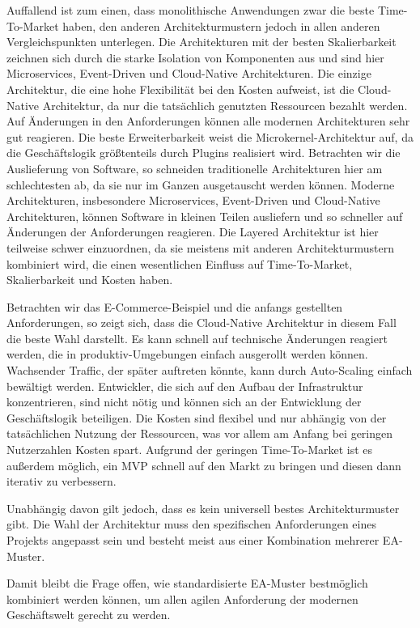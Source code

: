 \documentclass[acmtog]{acmart}
\begin{document}
Auffallend ist zum einen, dass monolithische Anwendungen zwar die beste Time-To-Market haben, den anderen Architekturmustern jedoch in allen anderen Vergleichspunkten unterlegen.
Die Architekturen mit der besten Skalierbarkeit zeichnen sich durch die starke Isolation von Komponenten aus und sind hier Microservices, Event-Driven und Cloud-Native Architekturen.
Die einzige Architektur, die eine hohe Flexibilität bei den Kosten aufweist, ist die Cloud-Native Architektur, da nur die tatsächlich genutzten Ressourcen bezahlt werden.
Auf Änderungen in den Anforderungen können alle modernen Architekturen sehr gut reagieren.
Die beste Erweiterbarkeit weist die Microkernel-Architektur auf, da die Geschäftslogik größtenteils durch Plugins realisiert wird.
Betrachten wir die Auslieferung von Software, so schneiden traditionelle Architekturen hier am schlechtesten ab, da sie nur im Ganzen ausgetauscht werden können.
Moderne Architekturen, insbesondere Microservices, Event-Driven und Cloud-Native Architekturen, können Software in kleinen Teilen ausliefern und so schneller auf Änderungen der Anforderungen reagieren.
Die Layered Architektur ist hier teilweise schwer einzuordnen, da sie meistens mit anderen Architekturmustern kombiniert wird, die einen wesentlichen Einfluss auf Time-To-Market, Skalierbarkeit und Kosten haben.

Betrachten wir das E-Commerce-Beispiel und die anfangs gestellten Anforderungen, so zeigt sich, dass die Cloud-Native Architektur in diesem Fall die beste Wahl darstellt.
Es kann schnell auf technische Änderungen reagiert werden, die in produktiv-Umgebungen einfach ausgerollt werden können.
Wachsender Traffic, der später auftreten könnte, kann durch Auto-Scaling einfach bewältigt werden.
Entwickler, die sich auf den Aufbau der Infrastruktur konzentrieren, sind nicht nötig und können sich an der Entwicklung der Geschäftslogik beteiligen.
Die Kosten sind flexibel und nur abhängig von der tatsächlichen Nutzung der Ressourcen, was vor allem am Anfang bei geringen Nutzerzahlen Kosten spart.
Aufgrund der geringen Time-To-Market ist es außerdem möglich, ein MVP schnell auf den Markt zu bringen und diesen dann iterativ zu verbessern.

Unabhängig davon gilt jedoch, dass es kein universell bestes Architekturmuster gibt.
Die Wahl der Architektur muss den spezifischen Anforderungen eines Projekts angepasst sein und besteht meist aus einer Kombination mehrerer EA-Muster.

Damit bleibt die Frage offen, wie standardisierte EA-Muster bestmöglich kombiniert werden können, um allen agilen Anforderung der modernen Geschäftswelt gerecht zu werden.
\end{document}
